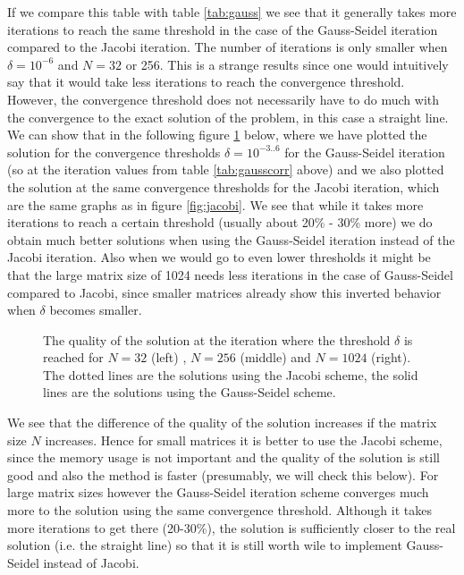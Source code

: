 \documentclass[11pt,a4paper,onecolumn]{article}
\begin{document}
If we compare this table with table \ref{tab:gauss} we see that it generally takes more iterations to reach the same threshold in the case of the Gauss-Seidel iteration compared to the Jacobi iteration. The number of iterations is only smaller when $\delta = 10^{-6}$ and $N = 32$ or 256. This is a strange results since one would intuitively say that it would take less iterations to reach the convergence threshold. However, the convergence threshold does not necessarily have to do much with the convergence to the exact solution of the problem, in this case a straight line. We can show that in the following figure \ref{fig:gauss} below, where we have plotted the solution for the convergence thresholds $\delta = 10^{-3..6}$ for the Gauss-Seidel iteration (so at the iteration values from table \ref{tab:gausscorr} above) and we also plotted the solution at the same convergence thresholds for the Jacobi iteration, which are the same graphs as in figure \ref{fig:jacobi}. We see that while it takes more iterations to reach a certain threshold (usually about 20\% - 30\% more) we do obtain much better solutions when using the Gauss-Seidel iteration instead of the Jacobi iteration. Also when we would go to even lower thresholds it might be that the large matrix size of 1024 needs less iterations in the case of Gauss-Seidel compared to Jacobi, since smaller matrices already show this inverted behavior when $\delta$ becomes smaller. 

\begin{figure}[H]
  \centering
  \caption{The quality of the solution at the iteration where the threshold $\delta$ is reached for $N = 32$ (left) , $N = 256$ (middle) and $N = 1024$ (right). The dotted lines are the solutions using the Jacobi scheme, the solid lines are the solutions using the Gauss-Seidel scheme.}
  \label{fig:gauss}
\end{figure}

We see that the difference of the quality of the solution increases if the matrix size $N$ increases. Hence for small matrices it is better to use the Jacobi scheme, since the memory usage is not important and the quality of the solution is still good and also the method is faster (presumably, we will check this below). For large matrix sizes however the Gauss-Seidel iteration scheme converges much more to the solution using the same convergence threshold. Although it takes more iterations to get there (20-30\%), the solution is sufficiently closer to the real solution (i.e. the straight line) so that it is still worth wile to implement Gauss-Seidel instead of Jacobi.
\end{document}
